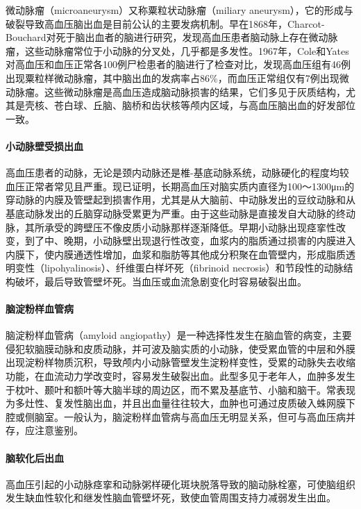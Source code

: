 微动脉瘤（microaneurysm）又称粟粒状动脉瘤（miliary
aneurysm），它的形成与破裂导致高血压脑出血是目前公认的主要发病机制。早在1868年，Charcot-Bouchard对死于脑出血者的脑进行研究，发现高血压患者脑动脉上存在微动脉瘤，这些动脉瘤常位于小动脉的分叉处，几乎都是多发性。1967年，Cole和Yates对高血压和血压正常各100例尸检患者的脑进行了检查对比，发现高血压组有46例出现粟粒样微动脉瘤，其中脑出血的发病率占86\%，而血压正常组仅有7例出现微动脉瘤。这些微动脉瘤是高血压造成脑动脉损害的结果，它们多见于灰质结构，尤其是壳核、苍白球、丘脑、脑桥和齿状核等颅内区域，与高血压脑出血的好发部位一致。

\paragraph{小动脉壁受损出血}

高血压患者的动脉，无论是颈内动脉还是椎-基底动脉系统，动脉硬化的程度均较血压正常者常见且严重。现已证明，长期高血压对脑实质内直径为100～1300μm的穿动脉的内膜及管壁起到损害作用，尤其是从大脑前、中动脉发出的豆纹动脉和从基底动脉发出的丘脑穿动脉受累更为严重。由于这些动脉是直接发自大动脉的终动脉，其所承受的跨壁压不像皮质小动脉那样逐渐降低。早期小动脉出现痉挛性改变，到了中、晚期，小动脉壁出现退行性改变，血浆内的脂质通过损害的内膜进入内膜下，使内膜通透性增加，血浆和脂肪等其他成分积聚在血管壁内，形成脂质透明变性（lipohyalinosis）、纤维蛋白样坏死（fibrinoid
necrosis）和节段性的动脉结构破坏，最后导致管壁坏死。当血压或血流急剧变化时容易破裂出血。

\paragraph{脑淀粉样血管病}

脑淀粉样血管病（amyloid
angiopathy）是一种选择性发生在脑血管的病变，主要侵犯软脑膜动脉和皮质动脉，并可波及脑实质的小动脉，使受累血管的中层和外膜出现淀粉样物质沉积，导致颅内小动脉管壁发生淀粉样变性，受累的动脉失去收缩功能，在血流动力学改变时，容易发生破裂出血。此型多见于老年人，血肿多发生于枕叶、颞叶和额叶等大脑半球的周边区，而不累及基底节、小脑和脑干。常表现为多灶性、复发性脑出血，并且出血量往往较大，血肿也可通过皮质破入蛛网膜下腔或侧脑室。一般认为，脑淀粉样血管病与高血压无明显关系，但可与高血压病并存，应注意鉴别。

\paragraph{脑软化后出血}

高血压引起的小动脉痉挛和动脉粥样硬化斑块脱落导致的脑动脉栓塞，可使脑组织发生缺血性软化和继发性脑血管壁坏死，致使血管周围支持力减弱发生出血。

